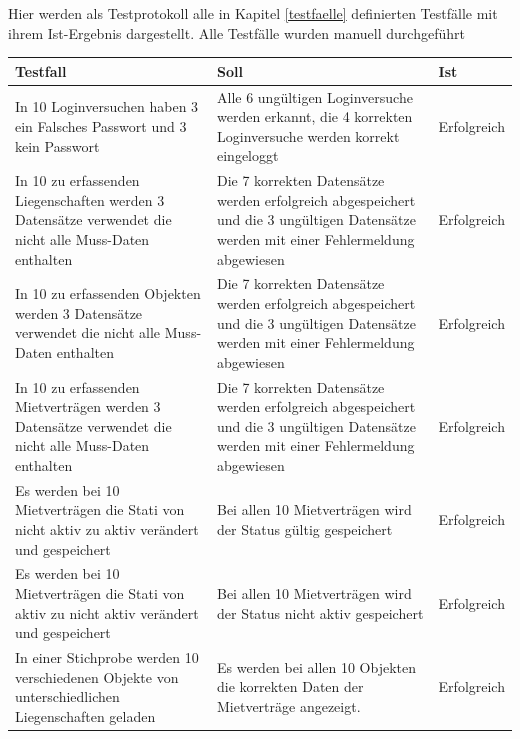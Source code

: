 Hier werden als Testprotokoll alle in Kapitel \ref{testfaelle} definierten Testfälle mit ihrem Ist-Ergebnis dargestellt. Alle Testfälle wurden manuell durchgeführt

\begin{table}[H]
  \centering
  \settowidth{}
  \setlength\extrarowheight{2pt}
  \begin{tabulary}{1.0\textwidth}{|L|L|m{2cm}|}
    \hline
    \textbf{Testfall}& 
    \textbf{Soll} &
    \textbf{Ist}\\
    \hline
    In 10 Loginversuchen haben 3 ein Falsches Passwort und 3 kein Passwort & Alle 6 ungültigen Loginversuche werden erkannt, die 4 korrekten Loginversuche werden korrekt eingeloggt &  Erfolgreich\\
    \hline
    In 10 zu erfassenden Liegenschaften werden 3 Datensätze verwendet die nicht alle Muss-Daten enthalten & Die 7 korrekten Datensätze werden erfolgreich abgespeichert und die 3 ungültigen Datensätze werden mit einer Fehlermeldung abgewiesen &  Erfolgreich\\
    \hline
    In 10 zu erfassenden Objekten werden 3 Datensätze verwendet die nicht alle Muss-Daten enthalten & Die 7 korrekten Datensätze werden erfolgreich abgespeichert und die 3 ungültigen Datensätze werden mit einer Fehlermeldung abgewiesen &  Erfolgreich\\
    \hline
    In 10 zu erfassenden Mietverträgen werden 3 Datensätze verwendet die nicht alle Muss-Daten enthalten & Die 7 korrekten Datensätze werden erfolgreich abgespeichert und die 3 ungültigen Datensätze werden mit einer Fehlermeldung abgewiesen & Erfolgreich\\
    \hline
    Es werden bei 10 Mietverträgen die Stati von nicht aktiv zu aktiv verändert und gespeichert & Bei allen 10 Mietverträgen wird der Status gültig gespeichert &  Erfolgreich\\
    \hline
    Es werden bei 10 Mietverträgen die Stati von aktiv zu nicht aktiv verändert und gespeichert & Bei allen 10 Mietverträgen wird der Status nicht aktiv gespeichert &  Erfolgreich\\
    \hline
    In einer Stichprobe werden 10 verschiedenen Objekte von unterschiedlichen Liegenschaften geladen & Es werden bei allen 10 Objekten die korrekten Daten der Mietverträge angezeigt. &  Erfolgreich\\

\end{tabulary}
\end{table}
